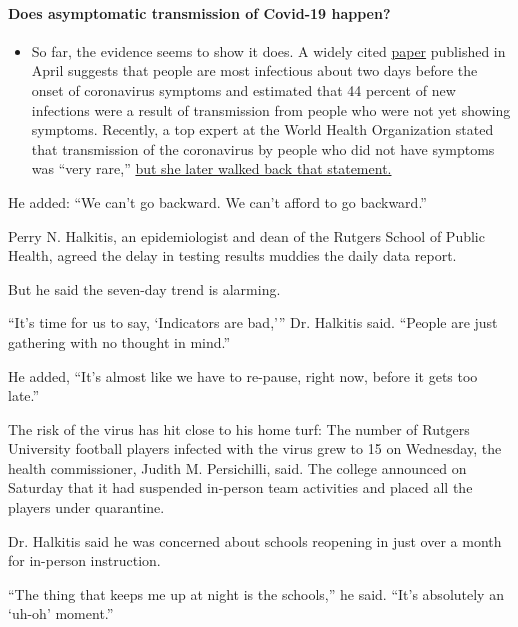 \begin{itemize}
{  \paragraph{Does asymptomatic transmission of Covid-19
  happen?}\label{does-asymptomatic-transmission-of-covid-19-happen}}

  \begin{itemize}
  \tightlist
  \item
    So far, the evidence seems to show it does. A widely cited
    \href{https://www.nature.com/articles/s41591-020-0869-5}{paper}
    published in April suggests that people are most infectious about
    two days before the onset of coronavirus symptoms and estimated that
    44 percent of new infections were a result of transmission from
    people who were not yet showing symptoms. Recently, a top expert at
    the World Health Organization stated that transmission of the
    coronavirus by people who did not have symptoms was ``very rare,''
    \href{https://www.nytimes.com/2020/06/09/world/coronavirus-updates.html?action=click\&pgtype=Article\&state=default\&region=MAIN_CONTENT_3\&context=storylines_faq\#link-1f302e21}{but
    she later walked back that statement.}
  \end{itemize}
\end{itemize}

He added: ``We can't go backward. We can't afford to go backward.''

Perry N. Halkitis, an epidemiologist and dean of the Rutgers School of
Public Health, agreed the delay in testing results muddies the daily
data report.

But he said the seven-day trend is alarming.

``It's time for us to say, `Indicators are bad,''' Dr. Halkitis said.
``People are just gathering with no thought in mind.''

He added, ``It's almost like we have to re-pause, right now, before it
gets too late.''

The risk of the virus has hit close to his home turf: The number of
Rutgers University football players infected with the virus grew to 15
on Wednesday, the health commissioner, Judith M. Persichilli, said. The
college announced on Saturday that it had suspended in-person team
activities and placed all the players under quarantine.

Dr. Halkitis said he was concerned about schools reopening in just over
a month for in-person instruction.

``The thing that keeps me up at night is the schools,'' he said. ``It's
absolutely an `uh-oh' moment.''

